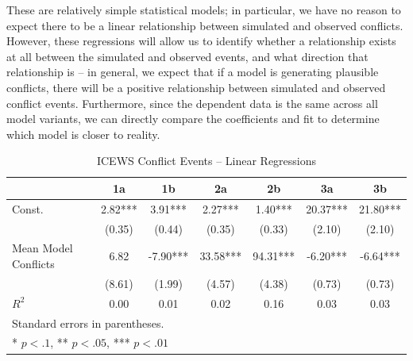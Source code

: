 These are relatively simple statistical models; in particular, we have no reason to expect there to be a linear relationship between simulated and observed conflicts. However, these regressions will allow us to identify whether a relationship exists at all between the simulated and observed events, and what direction that relationship is -- in general, we expect that if a model is generating plausible conflicts, there will be a positive relationship between simulated and observed conflict events. Furthermore, since the dependent data is the same across all model variants, we can directly compare the coefficients and fit to determine which model is closer to reality.


\begin{table}

\begin{center}
    \caption{ICEWS Conflict Events -- Linear Regressions}
    \label{table:icews_linear}
\begin{tabular}{lcccccc}
    \hline
                    &    1a   &    1b    &    2a    &    2b    &    3a    &    3b     \\
    \hline

    Const.          & 2.82*** & 3.91***  & 2.27***  & 1.40***  & 20.37*** & 21.80***  \\
                    & (0.35)  & (0.44)   & (0.35)   & (0.33)   & (2.10)   & (2.10)    \\
    Mean Model Conflicts & 6.82    & -7.90*** & 33.58*** & 94.31*** & -6.20*** & -6.64***  \\
                    & (8.61)  & (1.99)   & (4.57)   & (4.38)   & (0.73)   & (0.73)    \\
    \hline
    $R^2$             & 0.00    & 0.01     & 0.02     & 0.16     & 0.03     & 0.03      \\
    \hline
    \hline
    \multicolumn{7}{l}{Standard errors in parentheses.} \\
    \multicolumn{7}{l}{* $p<.1$, ** $p<.05$, *** $p<.01$} \\

    \end{tabular}
    \end{center}
    \tableSpace
\end{table}


